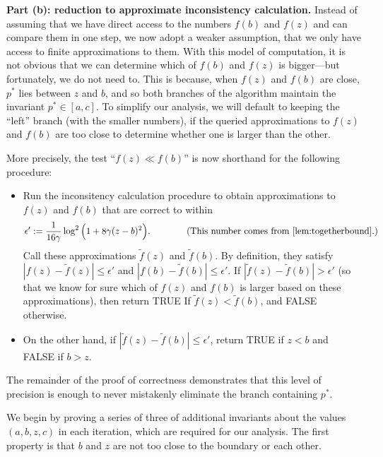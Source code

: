 \begin{lproof}
    \textbf{Part (b): reduction to approximate inconsistency calculation.}
    Instead of assuming that we have direct access to the numbers $f(b)$ and $f(z)$ and
    can compare them in one step, we now adopt a weaker assumption, that we only have
    access to finite approximations to them.
    With this model of computation, it is not obvious that we can determine which of $f(b)$ and $f(z)$ is bigger---but fortunately, we do not need to.
    This is because, when $f(z)$ and $f(b)$ are close, $p^*$ lies between $z$ and $b$, and so both branches of the algorithm maintain the invariant $p^* \in [a,c]$.
    To simplify our analysis, we will default to keeping the ``left'' branch (with the smaller numbers), if the queried approximations to $f(z)$ and $f(b)$ are too close to determine whether one is larger than the other.

    More precisely, the test ``$f(z) \ll f(b)$'' is now shorthand
    for the following procedure:
    \begin{itemize}
        \item
        Run the inconsitency calculation procedure to obtain
        approximations to $f(z)$ and $f(b)$ that are correct to within
        \begin{equation}
            \epsilon' :=
            \frac{1}{16 \gamma}
                    \log^2 \Big(
                         1 +  8 \gamma (z-b)^2
                     \Big).
            \qquad\qquad\text{(This number comes from \cref{lem:togetherbound}.)}
            \label{eq:query-precision}
        \end{equation}
        Call these approximations $\tilde f(z)$ and $\tilde f(b)$.
        By definition, they satisfy $|f(z) - \tilde f(z)| \le \epsilon'$ and $|f(b) - \tilde f(b)| \le \epsilon'$.
        If $|\tilde f(z) - \tilde f(b)| > \epsilon'$ (so that we know for sure which of $f(z)$ and $f(b)$ is larger based on these approximations), then return
        TRUE If $\tilde f(z) < \tilde f(b)$, and FALSE otherwise.
        \item
        On the other hand, if $|\tilde f(z) - \tilde f(b)| \le \epsilon'$,
        return TRUE if $z < b$ and FALSE if $b > z$.
    \end{itemize}

    The remainder of the proof of correctness demonstrates that this level of precision is enough to never mistakenly eliminate the branch containing $p^*$.
    
    We begin by proving a series of three of additional invariants about the values $(a,b,z,c)$ in each iteration, which are required for our analysis.
    The first property is
    that $b$ and $z$ are not too close to the boundary or each other.


\end{lproof}
